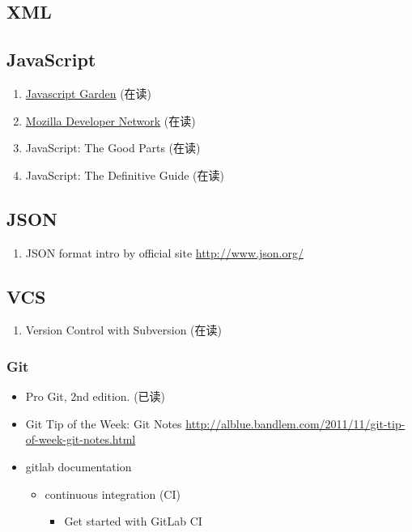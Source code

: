 \documentclass{article}
\begin{document}
\subsection{XML}
%
\subsection{JavaScript}
\begin{enumerate}
    \item  \href{http://bonsaiden.github.io/JavaScript-Garden/}{Javascript Garden} (在读)
    \item \href{https://developer.mozilla.org/en-US/Learn}{Mozilla Developer Network} (在读)
    \item JavaScript: The Good Parts (在读)
    \item JavaScript: The Definitive Guide (在读)
\end{enumerate}
\subsection{JSON}
\begin{enumerate}
    \item JSON format intro by official site \url{http://www.json.org/}
\end{enumerate}
\subsection{VCS}
\begin{enumerate}
    \item Version Control with Subversion (在读)
\end{enumerate}
%
\subsubsection{Git}
%
\begin{itemize}
    \item Pro Git, 2nd edition. (已读)
    \item Git Tip of the Week: Git Notes
        \url{http://alblue.bandlem.com/2011/11/git-tip-of-week-git-notes.html}
    \item gitlab documentation
        \begin{itemize}
            \item continuous integration (CI)
                \begin{itemize}
                    \item Get started with GitLab CI
                \end{itemize}
        \end{itemize}
\end{itemize}
\end{document}
